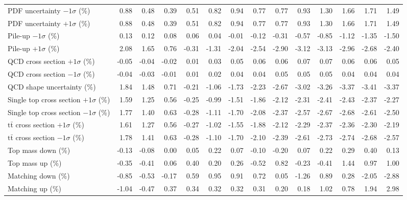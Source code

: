 \begin{table}[htbp]
{\begin{tabular}{lrrrrrrrrrrrrr}
PDF uncertainty $-1\sigma$ (\%) & 0.88 & 0.48 & 0.39 & 0.51 & 0.82 & 0.94 & 0.77 & 0.77 & 0.93 & 1.30 & 1.66 & 1.71 & 1.49 \\ 
PDF uncertainty $+1\sigma$ (\%) & 0.88 & 0.48 & 0.39 & 0.51 & 0.82 & 0.94 & 0.77 & 0.77 & 0.93 & 1.30 & 1.66 & 1.71 & 1.49 \\ 
Pile-up $-1\sigma$ (\%) & 0.13 & 0.12 & 0.08 & 0.06 & 0.04 & -0.01 & -0.12 & -0.31 & -0.57 & -0.85 & -1.12 & -1.35 & -1.50 \\ 
Pile-up $+1\sigma$ (\%) & 2.08 & 1.65 & 0.76 & -0.31 & -1.31 & -2.04 & -2.54 & -2.90 & -3.12 & -3.13 & -2.96 & -2.68 & -2.40 \\ 
QCD cross section \ensuremath{+1\sigma} (\%) & -0.05 & -0.04 & -0.02 & 0.01 & 0.03 & 0.05 & 0.06 & 0.06 & 0.07 & 0.07 & 0.06 & 0.06 & 0.05 \\ 
QCD cross section \ensuremath{-1\sigma} (\%) & -0.04 & -0.03 & -0.01 & 0.01 & 0.02 & 0.04 & 0.04 & 0.05 & 0.05 & 0.05 & 0.04 & 0.04 & 0.04 \\ 
QCD shape uncertainty (\%) & 1.84 & 1.48 & 0.71 & -0.21 & -1.06 & -1.73 & -2.23 & -2.67 & -3.02 & -3.26 & -3.37 & -3.41 & -3.37 \\ 
Single top cross section $+1\sigma$ (\%) & 1.59 & 1.25 & 0.56 & -0.25 & -0.99 & -1.51 & -1.86 & -2.12 & -2.31 & -2.41 & -2.43 & -2.37 & -2.27 \\ 
Single top cross section $-1\sigma$ (\%) & 1.77 & 1.40 & 0.63 & -0.28 & -1.11 & -1.70 & -2.08 & -2.37 & -2.57 & -2.67 & -2.68 & -2.61 & -2.50 \\ 
$\mathrm{t}\bar{\mathrm{t}}$ cross section $+1\sigma$ (\%) & 1.61 & 1.27 & 0.56 & -0.27 & -1.02 & -1.55 & -1.88 & -2.12 & -2.29 & -2.37 & -2.36 & -2.30 & -2.19 \\ 
$\mathrm{t}\bar{\mathrm{t}}$ cross section $-1\sigma$ (\%) & 1.78 & 1.41 & 0.63 & -0.28 & -1.10 & -1.70 & -2.10 & -2.39 & -2.61 & -2.73 & -2.74 & -2.68 & -2.57 \\ 
Top mass down (\%) & -0.13 & -0.08 & 0.00 & 0.05 & 0.22 & 0.07 & -0.10 & -0.20 & 0.07 & 0.22 & 0.29 & 0.40 & 0.13 \\ 
Top mass up (\%) & -0.35 & -0.41 & 0.06 & 0.40 & 0.20 & 0.26 & -0.52 & 0.82 & -0.23 & -0.41 & 1.44 & 0.97 & 1.00 \\ 
Matching down (\%) & -0.85 & -0.53 & -0.17 & 0.59 & 0.95 & 0.91 & 0.72 & 0.05 & -1.26 & 0.89 & 0.28 & -2.05 & -2.88 \\ 
Matching up (\%) & -1.04 & -0.47 & 0.37 & 0.34 & 0.32 & 0.32 & 0.31 & 0.20 & 0.18 & 1.02 & 0.78 & 1.94 & 2.98 \\ 

\end{tabular}}
\end{table}
